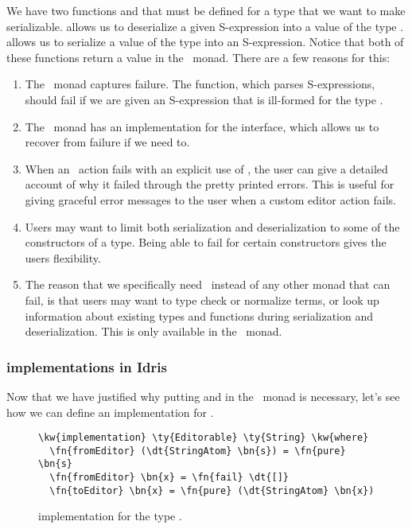 We have two functions  and  that must be defined
for a type that we want to make serializable.
 allows us to deserialize a given S-expression into a value of the type .
 allows us to serialize a value of the type  into an S-expression.
Notice that both of these functions return a value in the \Elab\ monad.
There are a few reasons for this:
\begin{enumerate}
  \item The \Elab\ monad captures failure. The 
    function, which parses S-expressions, should fail if we are
    given an S-expression that is ill-formed for the type .
  \item The \Elab\ monad has an implementation for the 
    interface, which allows us to recover from failure if we need to.
  \item When an \Elab\ action fails with an explicit use of
    ,
    the user can give a detailed account of why it failed through the pretty
    printed errors. This is useful for giving graceful error messages to the
    user when a custom editor action fails.
  \item Users may want to limit both serialization and deserialization
    to some of the constructors of a type. Being able to fail for certain
    constructors gives the users flexibility.
  \item The reason that we specifically need \Elab\ instead of any other monad that can
    fail, is that users may want to type check or normalize terms, or look up
    information about existing types and functions during serialization and
    deserialization. This is only available in the \Elab\ monad.
\end{enumerate}

\subsubsection{ implementations in Idris}

Now that we have justified why putting  and 
in the \Elab\ monad is necessary,
let's see how we can define an  implementation for .

\begin{figure}[H]
\caption{ implementation for the type .}
\begin{Verbatim}[framesep=2mm, label=\footnotesize{\normalfont{Idris}}, labelposition=topline]
\kw{implementation} \ty{Editorable} \ty{String} \kw{where}
  \fn{fromEditor} (\dt{StringAtom} \bn{s}) = \fn{pure} \bn{s}
  \fn{fromEditor} \bn{x} = \fn{fail} \dt{[]}
  \fn{toEditor} \bn{x} = \fn{pure} (\dt{StringAtom} \bn{x})
\end{Verbatim}
\end{figure}

